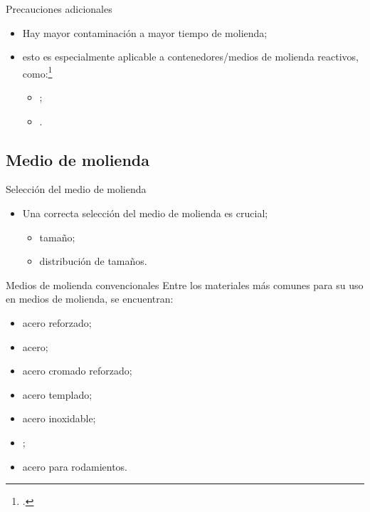 \documentclass[%
spanish,
progressbar=head,
subsectionpage,
aspectratio=169
]{beamer}
\begin{document}
\begin{frame}{Precauciones adicionales}
    \begin{itemize}
        \item Hay mayor contaminación a mayor tiempo de molienda;
        \item esto es especialmente aplicable a contenedores/medios de molienda reactivos, como:\footcite[64]{suryanarayanaMechanicalAlloyingMilling2004}
        \begin{itemize}
            \item {};
            \item {}.
        \end{itemize}
    \end{itemize}
\end{frame}

\subsection{Medio de molienda}

\begin{frame}{Selección del medio de molienda}
    \begin{itemize}
        \item Una correcta selección del medio de molienda es crucial;
        \begin{itemize}
            \item tamaño;
            \item distribución de tamaños.
        \end{itemize}
    \end{itemize}
\end{frame}

\begin{frame}{Medios de molienda convencionales}
    Entre los materiales más comunes para su uso en medios de molienda, se encuentran:
    \begin{itemize}
        \item acero reforzado;
        \item acero;
        \item acero cromado reforzado;
        \item acero templado;
        \item acero inoxidable;
        \item {};
        \item acero para rodamientos. 
    \end{itemize}
\end{frame}
\end{document}
